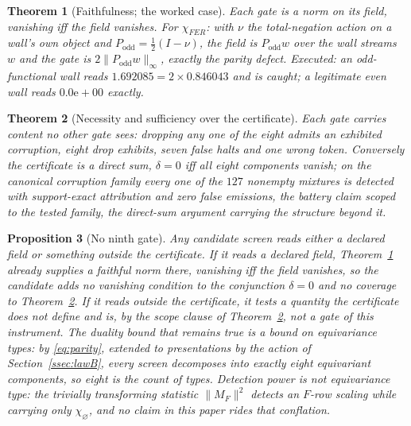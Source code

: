 \documentclass[twocolumn,10pt]{article}
\theoremstyle{plain}
\newtheorem{theorem}{Theorem}[section]
\newtheorem{proposition}[theorem]{Proposition}
\theoremstyle{definition}
\begin{document}
\begin{theorem}[Faithfulness; the worked case]\label{thm:faithful}
Each gate is a norm on its field, vanishing iff the field vanishes. For $\chi_{FER}$: with $\nu$ the total-negation action on a wall's own object and $P_{\mathrm{odd}}=\tfrac12(I-\nu)$, the field is $P_{\mathrm{odd}}w$ over the wall streams $w$ and the gate is $2\lVert P_{\mathrm{odd}}w\rVert_\infty$, exactly the parity defect. Executed: an odd-functional wall reads $1.692085=2\times0.846043$ and is caught; a legitimate even wall reads $0.0\mathrm{e}{+}00$ exactly.
\end{theorem}

\begin{theorem}[Necessity and sufficiency over the certificate]\label{thm:necsuf}
Each gate carries content no other gate sees: dropping any one of the eight admits an exhibited corruption, eight drop exhibits, seven false halts and one wrong token. Conversely the certificate is a direct sum, $\delta=0$ iff all eight components vanish; on the canonical corruption family every one of the $127$ nonempty mixtures is detected with support-exact attribution and zero false emissions, the battery claim scoped to the tested family, the direct-sum argument carrying the structure beyond it.
\end{theorem}

\begin{proposition}[No ninth gate]\label{prop:noninth}
Any candidate screen reads either a declared field or something outside the certificate. If it reads a declared field, Theorem~\ref{thm:faithful} already supplies a faithful norm there, vanishing iff the field vanishes, so the candidate adds no vanishing condition to the conjunction $\delta=0$ and no coverage to Theorem~\ref{thm:necsuf}. If it reads outside the certificate, it tests a quantity the certificate does not define and is, by the scope clause of Theorem~\ref{thm:necsuf}, not a gate of this instrument. The duality bound that remains true is a bound on \emph{equivariance types}: by \eqref{eq:parity}, extended to presentations by the action of Section~\ref{ssec:lawB}, every screen decomposes into exactly eight equivariant components, so eight is the count of types. Detection power is not equivariance type: the trivially transforming statistic $\lVert M_F\rVert^2$ detects an $F$-row scaling while carrying only $\chi_\varnothing$, and no claim in this paper rides that conflation.
\end{proposition}
\end{document}
